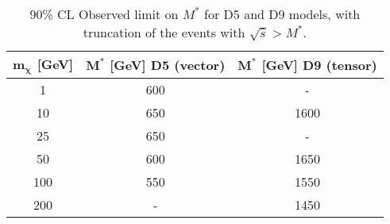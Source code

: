 \begin{table}[ht!]
   \centering
\begin{tabular}{ccc}
\hline\hline
{\bf $\mathbf{m_{\chi}}$ [GeV]} & {\bf $\mathbf{M^*}$ [GeV] D5 (vector)} & {\bf $\mathbf{M^*}$ [GeV] D9 (tensor)} \\ 
\hline
1	   &	600	&		-	      \\
10	   &	650	&		1600   	\\
25	   &	650	&		-         \\
50	   &	600	&		1650   	\\
100	   &	550	&		1550   	\\
200	   &	-   &		1450   	\\
\hline\hline
\end{tabular}
\caption{90\% CL Observed limit on $M^*$ for D5 and D9 models, with truncation of the events with $\sqrt{\hat{s}}>M^*$.}
\label{tab:WIMPsEffective_limit_mstar_trunc}
\end{table}
